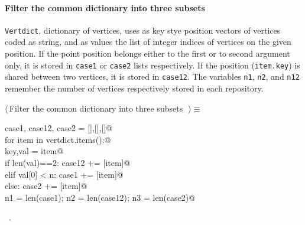 \documentclass[11pt,oneside]{article}	%
\begin{document}
\paragraph{Filter the common dictionary into three subsets}
\texttt{Vertdict}, dictionary of vertices, uses as key stye position vectors of vertices coded as string, and as values the list of integer indices of vertices on the given position. If the point position belongs either to the first or to second argument only, it is stored in \texttt{case1} or \texttt{case2} lists respectively. If the position (\texttt{item.key}) is shared between two vertices, it is stored in \texttt{case12}.
The variables \texttt{n1}, \texttt{n2}, and \texttt{n12} remember the number of vertices respectively stored in each repository.
\begin{flushleft} \small \label{scrap6}
$\langle\,$Filter the common dictionary into three subsets\nobreak\ {\footnotesize {}}$\,\rangle\equiv$
\vspace{-1ex}
\begin{list}{}{} \item
\mbox{}\verb@   case1, case12, case2 = [],[],[]@\\
\mbox{}\verb@   for item in vertdict.items():@\\
\mbox{}\verb@      key,val = item@\\
\mbox{}\verb@      if len(val)==2:  case12 += [item]@\\
\mbox{}\verb@      elif val[0] < n: case1 += [item]@\\
\mbox{}\verb@      else: case2 += [item]@\\
\mbox{}\verb@   n1 = len(case1); n2 = len(case12); n3 = len(case2)@\\
\mbox{}\verb@@{\NWsep}
\end{list}
\vspace{-1ex}
\footnotesize\addtolength{\baselineskip}{-1ex}
\begin{list}{}{\setlength{\itemsep}{-\parsep}\setlength{\itemindent}{-\leftmargin}}
\item \NWtxtMacroRefIn\ .
\end{list}
\end{flushleft}
\end{document}

